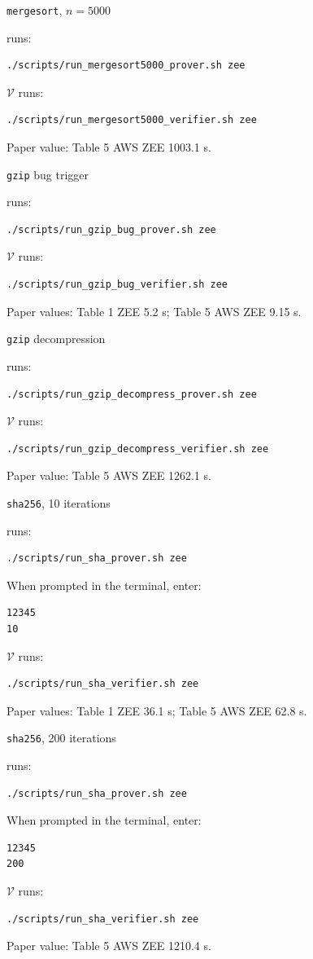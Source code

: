 \documentclass[nonacm,sigconf]{acmart}
\let\P\undefined
\newcommand{\P}{\ensuremath{\mathcal{P}}\xspace}
\newcommand{\V}{\ensuremath{\mathcal{V}}\xspace}
\begin{document}
\begin{compactitem}
\item \texttt{mergesort}, $n=5000$

\P runs:
\begin{verbatim}
./scripts/run_mergesort5000_prover.sh zee
\end{verbatim}
\V runs:
\begin{verbatim}
./scripts/run_mergesort5000_verifier.sh zee
\end{verbatim}
Paper value: Table 5 AWS ZEE 1003.1 s.

\item \texttt{gzip} bug trigger

\P runs:
\begin{verbatim}
./scripts/run_gzip_bug_prover.sh zee
\end{verbatim}
\V runs:
\begin{verbatim}
./scripts/run_gzip_bug_verifier.sh zee
\end{verbatim}
Paper values: Table 1 ZEE 5.2 s; Table 5 AWS ZEE 9.15 s.

\item \texttt{gzip} decompression

\P runs:
\begin{verbatim}
./scripts/run_gzip_decompress_prover.sh zee
\end{verbatim}
\V runs:
\begin{verbatim}
./scripts/run_gzip_decompress_verifier.sh zee
\end{verbatim}
Paper value: Table 5 AWS ZEE 1262.1 s.

\item \texttt{sha256}, 10 iterations

\P runs:
\begin{verbatim}
./scripts/run_sha_prover.sh zee
\end{verbatim}
When prompted in the \P terminal, enter:
\begin{verbatim}
12345
10
\end{verbatim}
\V runs:
\begin{verbatim}
./scripts/run_sha_verifier.sh zee
\end{verbatim}
Paper values: Table 1 ZEE 36.1 s; Table 5 AWS ZEE 62.8 s.

\item \texttt{sha256}, 200 iterations

\P runs:
\begin{verbatim}
./scripts/run_sha_prover.sh zee
\end{verbatim}
When prompted in the \P terminal, enter:
\begin{verbatim}
12345
200
\end{verbatim}
\V runs:
\begin{verbatim}
./scripts/run_sha_verifier.sh zee
\end{verbatim}
Paper value: Table 5 AWS ZEE 1210.4 s.
\end{compactitem}
\end{document}
